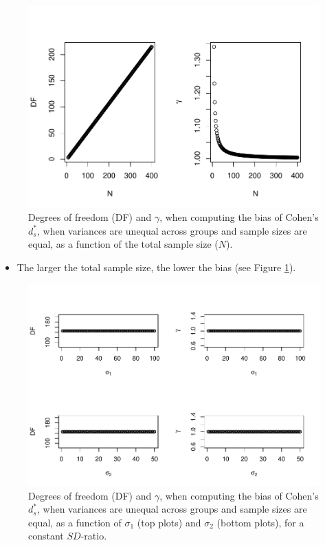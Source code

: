 \documentclass[
  english,
  man]{apa6}
\providecommand{\tightlist}{%
  \setlength{\itemsep}{0pt}\setlength{\parskip}{0pt}}
\begin{document}
\begin{figure}
\centering
\includegraphics{Theoretical-Bias-of-all-estimators-as-a-function-of-population-parameters_files/figure-latex/biascohendprimehetbalNsize2-1.pdf}
\caption{\label{fig:biascohendprimehetbalNsize2}Degrees of freedom (DF) and \(\gamma\), when computing the bias of Cohen's \(d^*_s\), when variances are unequal across groups and sample sizes are equal, as a function of the total sample size (\(N\)).}
\end{figure}

\begin{itemize}
\tightlist
\item
  The larger the total sample size, the lower the bias (see Figure \ref{fig:biascohendprimehetbalNsize2}).
\end{itemize}

\begin{figure}
\centering
\includegraphics{Theoretical-Bias-of-all-estimators-as-a-function-of-population-parameters_files/figure-latex/biascohendprimehetbalvariance2-1.pdf}
\caption{\label{fig:biascohendprimehetbalvariance2}Degrees of freedom (DF) and \(\gamma\), when computing the bias of Cohen's \(d^*_s\), when variances are unequal across groups and sample sizes are equal, as a function of \(\sigma_1\) (top plots) and \(\sigma_2\) (bottom plots), for a constant \(SD\)-ratio.}
\end{figure}
\end{document}
